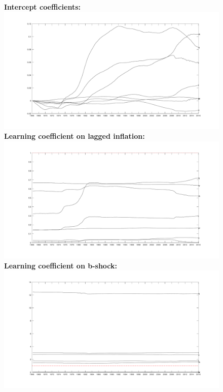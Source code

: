 \documentclass[12pt,reqno]{article}
\numberwithin{equation}{section}
\begin{document}
\begin{figure}[H]
\textbf{Intercept coefficients:}\\
\includegraphics[scale=0.3]{sw_msv_learning_alphas.pdf}\\
\textbf{Learning coefficient on lagged inflation:}\\
\includegraphics[scale=0.3]{sw_msv_learning_laggedInfl.pdf}\\
\textbf{Learning coefficient on  b-shock:}\\
\includegraphics[scale=0.3]{sw_msv_learning_bShock.pdf}\\
\end{figure}
\end{document}
